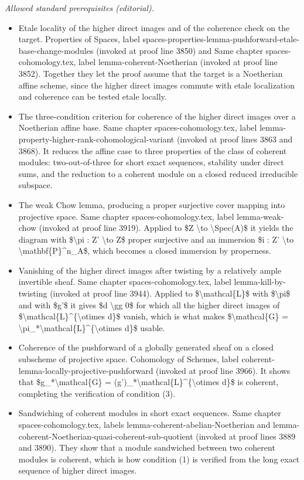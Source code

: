 \documentclass[10pt,a4paper]{amsart}
\theoremstyle{plain}
\theoremstyle{definition}
\theoremstyle{remark}
\numberwithin{equation}{subsection}
\begin{document}
\noindent\textit{Allowed standard prerequisites (editorial).}\begin{itemize}
\item Etale locality of the higher direct images and of the coherence check on the target. Properties of Spaces, label spaces-properties-lemma-pushforward-etale-base-change-modules (invoked at proof line 3850) and Same chapter spaces-cohomology.tex, label lemma-coherent-Noetherian (invoked at proof line 3852). Together they let the proof assume that the target is a Noetherian affine scheme, since the higher direct images commute with etale localization and coherence can be tested etale locally.
\item The three-condition criterion for coherence of the higher direct images over a Noetherian affine base. Same chapter spaces-cohomology.tex, label lemma-property-higher-rank-cohomological-variant (invoked at proof lines 3863 and 3868). It reduces the affine case to three properties of the class of coherent modules: two-out-of-three for short exact sequences, stability under direct sums, and the reduction to a coherent module on a closed reduced irreducible subspace.
\item The weak Chow lemma, producing a proper surjective cover mapping into projective space. Same chapter spaces-cohomology.tex, label lemma-weak-chow (invoked at proof line 3919). Applied to \$Z \textbackslash{}to \textbackslash{}Spec(A)\$ it yields the diagram with \$\textbackslash{}pi : Z' \textbackslash{}to Z\$ proper surjective and an immersion \$i : Z' \textbackslash{}to \textbackslash{}mathbf\{P\}\textasciicircum{}n\_A\$, which becomes a closed immersion by properness.
\item Vanishing of the higher direct images after twisting by a relatively ample invertible sheaf. Same chapter spaces-cohomology.tex, label lemma-kill-by-twisting (invoked at proof line 3944). Applied to \$\textbackslash{}mathcal\{L\}\$ with \$\textbackslash{}pi\$ and with \$g'\$ it gives \$d \textbackslash{}gg 0\$ for which all the higher direct images of \$\textbackslash{}mathcal\{L\}\textasciicircum{}\{\textbackslash{}otimes d\}\$ vanish, which is what makes \$\textbackslash{}mathcal\{G\} = \textbackslash{}pi\_*\textbackslash{}mathcal\{L\}\textasciicircum{}\{\textbackslash{}otimes d\}\$ usable.
\item Coherence of the pushforward of a globally generated sheaf on a closed subscheme of projective space. Cohomology of Schemes, label coherent-lemma-locally-projective-pushforward (invoked at proof line 3966). It shows that \$g\_*\textbackslash{}mathcal\{G\} = (g')\_*\textbackslash{}mathcal\{L\}\textasciicircum{}\{\textbackslash{}otimes d\}\$ is coherent, completing the verification of condition (3).
\item Sandwiching of coherent modules in short exact sequences. Same chapter spaces-cohomology.tex, labels lemma-coherent-abelian-Noetherian and lemma-coherent-Noetherian-quasi-coherent-sub-quotient (invoked at proof lines 3889 and 3890). They show that a module sandwiched between two coherent modules is coherent, which is how condition (1) is verified from the long exact sequence of higher direct images.
\end{itemize}\medskip
\end{document}
